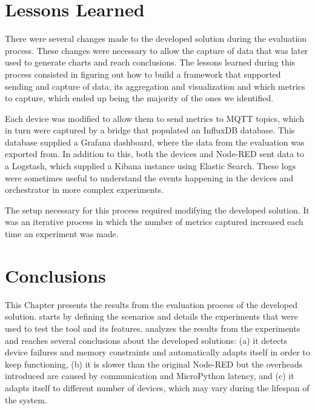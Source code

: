 \section{Lessons Learned}\label{sec:evaluation_lessons_learned}

There were several changes made to the developed solution during the evaluation process. These changes were necessary to allow the capture of data that was later used to generate charts and reach conclusions. The lessons learned during this process consisted in figuring out how to build a framework that supported sending and capture of data, its aggregation and visualization and which metrics to capture, which ended up being the majority of the ones we identified.

Each device was modified to allow them to send metrics to MQTT topics, which in turn were captured by a bridge that populated an InfluxDB database. This database supplied a Grafana dashboard, where the data from the evaluation was exported from. In addition to this, both the devices and Node-RED sent data to a Logstash, which supplied a Kibana instance using Elastic Search. These logs were sometimes useful to understand the events happening in the devices and orchestrator in more complex experiments.

The setup necessary for this process required modifying the developed solution. It was an iterative process in which the number of metrics captured increased each time an experiment was made.

\section{Conclusions}\label{sec:evaluation_conclusions}

This Chapter presents the results from the evaluation process of the developed solution.  starts by defining the scenarios and  details the experiments that were used to test the tool and its features.  analyzes the results from the experiments and reaches several conclusions about the developed solutions: (a) it detects device failures and memory constraints and automatically adapts itself in order to keep functioning, (b) it is slower than the original Node-RED but the overheads introduced are caused by communication and MicroPython latency, and (c) it adapts itself to different number of devices, which may vary during the lifespan of the system.

